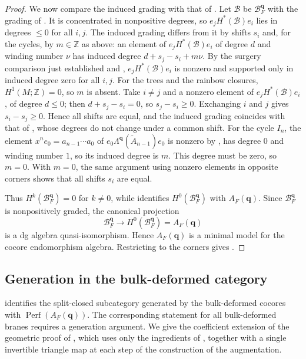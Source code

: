 \documentclass[a4paper]{amsart}
\newcommand{\ZZ}{\mathbb{Z}}
\DeclareMathOperator{\Perf}{Perf}
\numberwithin{equation}{section}
\begin{document}
\begin{proof}
We now compare the induced grading with that of
. Let $\mathcal B$ be $\mathcal B_F^{\boldsymbol q}$ with the grading of
. It is concentrated in nonpositive degrees, so
$e_jH^*(\mathcal B)e_i$ lies in degrees $\le0$ for all $i,j$. The
induced grading differs from it by shifts $s_i$ and, for the cycles, by
$m\in\ZZ$ as above: an element of $e_jH^*(\mathcal B)e_i$ of degree $d$
and winding number $\nu$ has induced degree $d+s_j-s_i+m\nu$.
By the surgery comparison just established and
, $e_jH^*(\mathcal B)e_i$ is nonzero and
supported only in induced degree zero for all $i,j$.
For the trees and the rainbow closures, $H^1(M;\ZZ)=0$, so $m$ is
absent. Take $i\ne j$ and a nonzero element of
$e_jH^*(\mathcal B)e_i$, of degree $d\le0$; then $d+s_j-s_i=0$, so
$s_j-s_i\ge0$. Exchanging $i$ and $j$ gives $s_i-s_j\ge0$. Hence all
shifts are equal, and the induced grading coincides with that of
, whose degrees do not change under a common shift.
For the cycle $I_n$, the element $x^ne_0=a_{n-1}\cdots a_0$ of
$e_0\Lambda^{\boldsymbol q}(\widetilde A_{n-1})e_0$ is nonzero by
, has degree $0$ and winding number $1$, so its
induced degree is $m$. This degree must be zero, so $m=0$. With $m=0$,
the same argument using nonzero elements in opposite corners shows
that all shifts $s_i$ are equal.

Thus
$H^k(\mathcal B_F^{\boldsymbol q})=0$ for $k\ne0$, while
 identifies
$H^0(\mathcal B_F^{\boldsymbol q})$ with $A_F(\boldsymbol q)$.
Since $\mathcal B_F^{\boldsymbol q}$ is nonpositively graded, the
canonical projection
\[
 \mathcal B_F^{\boldsymbol q}\longrightarrow H^0(\mathcal B_F^{\boldsymbol q})
 =A_F(\boldsymbol q)
\]
is a dg algebra quasi-isomorphism. Hence $A_F(\boldsymbol q)$ is a
minimal model for the cocore endomorphism algebra. Restricting to the
corners gives .
\end{proof}

\subsection{Generation in the bulk-deformed category}
\label{subsec:generation}

 identifies the split-closed subcategory
generated by the bulk-deformed cocores with $\Perf(A_F(\boldsymbol q))$.
The corresponding statement for all bulk-deformed branes requires a
generation argument. We give the coefficient extension of the
geometric proof of \cite[Theorem~1.1 and Remark~1.3]{CDRGG}, which uses only the
ingredients of , together with a
single invertible triangle map at each step of the construction
of the augmentation.
\end{document}
